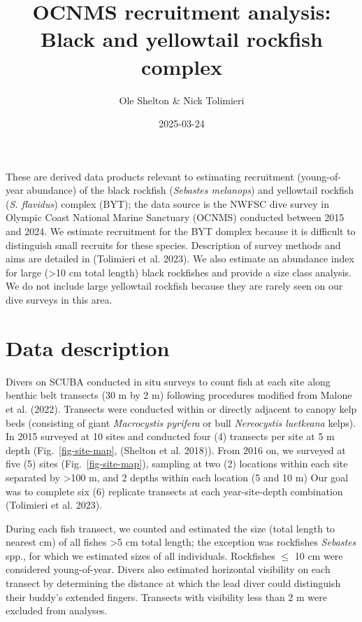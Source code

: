 \documentclass[
  letterpaper,
  DIV=11,
  numbers=noendperiod]{scrartcl}
\title{OCNMS recruitment analysis: Black and yellowtail rockfish
complex}
\author{Ole Shelton \& Nick Tolimieri}
\date{2025-03-24}
\begin{document}
\maketitle
\ifdefined\Shaded\renewenvironment{Shaded}{\begin{tcolorbox}[interior hidden, enhanced, boxrule=0pt, sharp corners, borderline west={3pt}{0pt}{shadecolor}, frame hidden, breakable]}{\end{tcolorbox}}\fi

These are derived data products relevant to estimating recruitment
(young-of-year abundance) of the black rockfish (\emph{Sebastes
melanops}) and yellowtail rockfish (\emph{S. flavidus}) complex (BYT);
the data source is the NWFSC dive survey in Olympic Coast National
Marine Sanctuary (OCNMS) conducted between 2015 and 2024. We estimate
recruitment for the BYT domplex because it is difficult to distinguish
small recruits for these species. Description of survey methods and aims
are detailed in (Tolimieri et al. 2023). We also estimate an abundance
index for large (\textgreater10 cm total length) black rockfishes and
provide a size class analysis. We do not include large yellowtail
rockfish because they are rarely seen on our dive surveys in this area.

\hypertarget{data-description}{%
\section{Data description}\label{data-description}}

Divers on SCUBA conducted in situ surveys to count fish at each site
along benthic belt transects (30 m by 2 m) following procedures modified
from Malone et al. (2022). Transects were conducted within or directly
adjacent to canopy kelp beds (consisting of giant \emph{Macrocystis
pyrifera} or bull \emph{Nereocystis luetkeana} kelps). In 2015 surveyed
at 10 sites and conducted four (4) transects per site at 5 m depth
(Fig.~\ref{fig-site-map}, (Shelton et al. 2018)). From 2016 on, we
surveyed at five (5) sites (Fig.~\ref{fig-site-map}), sampling at two
(2) locations within each site separated by \textgreater100 m, and 2
depths within each location (5 and 10 m) Our goal was to complete six
(6) replicate transects at each year-site-depth combination (Tolimieri
et al. 2023).

During each fish transect, we counted and estimated the size (total
length to nearest cm) of all fishes \textgreater5 cm total length; the
exception was rockfishes \emph{Sebastes} spp., for which we estimated
sizes of all individuals. Rockfishes \(\leq\) 10 cm were considered
young-of-year. Divers also estimated horizontal visibility on each
transect by determining the distance at which the lead diver could
distinguish their buddy's extended fingers. Transects with visibility
less than 2 m were excluded from analyses.
\end{document}
